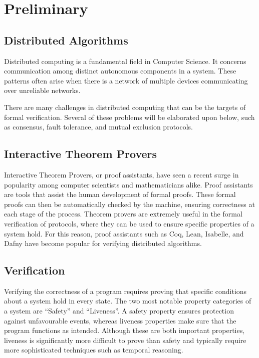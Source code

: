 \documentclass[acmsmall,screen,review]{acmart}
\begin{document}
\section{Preliminary}

\subsection{Distributed Algorithms}
  Distributed computing is a fundamental field in Computer Science.
  It concerns communication among distinct autonomous components in a system.
  These patterns often arise when there is a network of multiple devices communicating over unreliable networks.

  There are many challenges in distributed computing that can be the targets of formal verification.
  Several of these problems will be elaborated upon below, such as consensus, fault tolerance, and mutual exclusion protocols.

\subsection{Interactive Theorem Provers}
  Interactive Theorem Provers, or proof assistants, have seen a recent surge in popularity among computer scientists and mathematicians alike.
  Proof assistants are tools that assist the human development of formal proofs.
  These formal proofs can then be automatically checked by the machine, ensuring correctness at each stage of the process. 
  Theorem provers are extremely useful in the formal verification of protocols, where they can be used to ensure specific properties of a system hold.
  For this reason, proof assistants such as Coq, Lean, Isabelle, and Dafny have become popular for verifying distributed algorithms.

\subsection{Verification}
  Verifying the correctness of a program requires proving that specific conditions about a system hold in every state.
  The two most notable property categories of a system are ``Safety'' and ``Liveness''.
  A safety property ensures protection against unfavourable events, whereas liveness properties make sure that the program functions as intended.
  Although these are both important properties, liveness is significantly more difficult to prove than safety and typically require more sophisticated techniques such as temporal reasoning.
\end{document}
